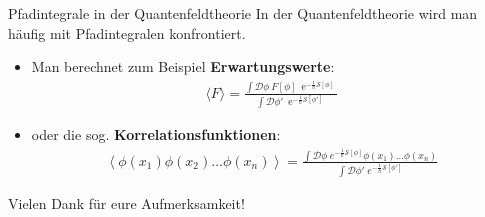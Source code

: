 \begin{frame}{Pfadintegrale in der Quantenfeldtheorie}
In der Quantenfeldtheorie wird man häufig mit Pfadintegralen konfrontiert. \\
\begin{itemize}
	\item Man berechnet zum Beispiel \textbf{Erwartungswerte}:
\begin{align*}
	\langle F \rangle = \frac{\int\mathcal{D}\phi \ F[\phi]\ \operatorname{e}^{-\frac{1}{\hbar}\mathcal{S}[\phi]}}{\int\mathcal{D}\phi' \ \operatorname{e}^{-\frac{1}{\hbar}\mathcal{S}[\phi']}}
\end{align*}
\item oder die sog. \textbf{Korrelationsfunktionen}:
\begin{align*}
\left\langle \phi(x_1) \phi(x_2) \ldots \phi(x_n)\right\rangle
=\frac{\int \mathcal D \phi \; e^{-\frac{1}{\hbar}\mathcal{S}[\phi]}\phi(x_1)\ldots \phi(x_n)}{\int \mathcal D \phi' \; e^{-\frac{1}{\hbar}\mathcal{S}[\phi']}}
\end{align*}
\end{itemize}
\end{frame}

\begin{frame}
\begin{block}{\hfill \Large Vielen Dank für eure Aufmerksamkeit! \hfill}
	
\end{block}

\end{frame}